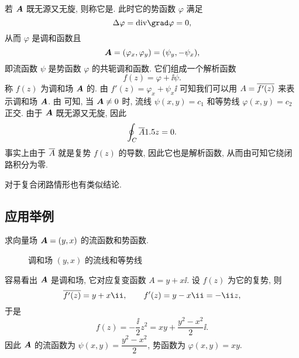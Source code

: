 若 ${\boldsymbol{A}}$ 既无源又无旋, 则称它是.
此时它的势函数 $\varphi$ 满足
\[
  \Delta \varphi=\div\grad\varphi=0,
\]
从而 $\varphi$ 是调和函数且
\[
  {\boldsymbol{A}}=(\varphi_x,\varphi_y)
  =(\psi_y,-\psi_x),
\]
即流函数 $\psi$ 是势函数 $\varphi$ 的共轭调和函数.
它们组成一个解析函数
\[
  f(z)=\varphi+\ii\psi.
\]
称 $f(z)$ 为调和场 ${\boldsymbol{A}}$ 的.
由 $f'(z)=\varphi_x+\psi_x\ii$ 可知我们可以用 $A=\overline{f'(z)}$ 来表示调和场 ${\boldsymbol{A}}$.
由 可知, 当 ${\boldsymbol{A}}\neq 0$ 时, 流线 $\psi(x,y)=c_1$ 和等势线 $\varphi(x,y)=c_2$ 正交.
由于 ${\boldsymbol{A}}$ 既无源又无旋, 因此
\[
  \oint_C \overline A1.5 z=0.
\]
事实上由于 $\overline A$ 就是复势 $f(z)$ 的导数, 因此它也是解析函数, 从而由\thmCG 可知它绕闭路积分为零.

对于复合闭路情形也有类似结论.


\subsection{应用举例}

\begin{example}
  求向量场 ${\boldsymbol{A}}=(y,x)$ 的流函数和势函数.
\end{example}

\begin{figure}[H]
  \centering
  \caption{调和场 $(y,x)$ 的流线和等势线}
\end{figure}

\begin{solution}
  容易看出 ${\boldsymbol{A}}$ 是调和场, 它对应复变函数 $A=y+x\ii$.
  设 $f(z)$ 为它的复势, 则
  \[
    \ov{f'(z)}=y+x\ii,\qquad
    f'(z)=y-x\ii=-\ii z,
  \]
  于是
  \[
    f(z)=-\frac\ii2z^2
    =xy+\frac{y^2-x^2}2\ii.
  \]
  因此 ${\boldsymbol{A}}$ 的流函数为 $\psi(x,y)=\dfrac{y^2-x^2}2$, 势函数为 $\varphi(x,y)=xy$.
\end{solution}

